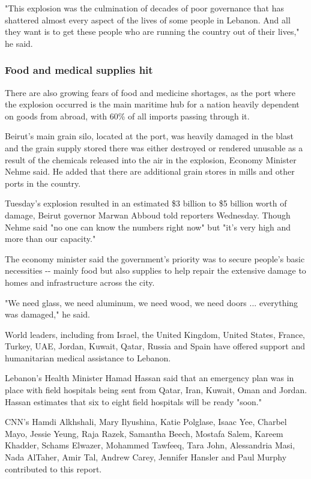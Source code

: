 "This explosion was the culmination of decades of poor governance that
has shattered almost every aspect of the lives of some people in
Lebanon. And all they want is to get these people who are running the
country out of their lives," he said.

\hypertarget{food-and-medical-supplies-hit}{%
\subsubsection{Food and medical supplies
hit}\label{food-and-medical-supplies-hit}}

There are also growing fears of food and medicine shortages, as the port
where the explosion occurred is the main maritime hub for a nation
heavily dependent on goods from abroad, with 60\% of all imports passing
through it.

Beirut's main grain silo, located at the port, was heavily damaged in
the blast and the grain supply stored there was either destroyed or
rendered unusable as a result of the chemicals released into the air in
the explosion, Economy Minister Nehme said. He added that there are
additional grain stores in mills and other ports in the country.

Tuesday's explosion resulted in an estimated \$3 billion to \$5 billion
worth of damage, Beirut governor Marwan Abboud told reporters Wednesday.
Though Nehme said "no one can know the numbers right now" but "it's very
high and more than our capacity."

The economy minister said the government's priority was to secure
people's basic necessities -\/- mainly food but also supplies to help
repair the extensive damage to homes and infrastructure across the city.

"We need glass, we need aluminum, we need wood, we need doors ...
everything was damaged," he said.

World leaders, including from Israel, the United Kingdom, United States,
France, Turkey, UAE, Jordan, Kuwait, Qatar, Russia and Spain have
offered support and humanitarian medical assistance to Lebanon.

Lebanon's Health Minister Hamad Hassan said that an emergency plan was
in place with field hospitals being sent from Qatar, Iran, Kuwait, Oman
and Jordan. Hassan estimates that six to eight field hospitals will be
ready "soon."

CNN's Hamdi Alkhshali, Mary Ilyushina, Katie Polglase, Isaac Yee,
Charbel Mayo, Jessie Yeung, Raja Razek, Samantha Beech, Mostafa Salem,
Kareem Khadder, Schams Elwazer, Mohammed Tawfeeq, Tara John, Alessandria
Masi, Nada AlTaher, Amir Tal, Andrew Carey, Jennifer Hansler and Paul
Murphy contributed to this report.

